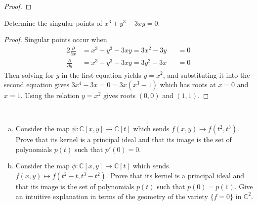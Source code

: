 \documentclass{article}
\newenvironment{problem}[2][Problem]{\begin{trivlist}
\item[\hskip \labelsep {\bfseries #1}\hskip \labelsep {\bfseries #2.}]}{\end{trivlist}}
\newcommand{\set}[1]{\{ #1 \}}
\newcommand{\fn}[3]{#1 \colon #2 \rightarrow #3}
\begin{document}
\begin{proof}

\end{proof}
\pagebreak
\begin{problem}{15 (Artin)}
  Determine the singular points of $x^3 + y^3  - 3xy = 0$.
\end{problem}

\begin{proof}
  Singular points occur when \begin{alignat*}{2}
    \frac{\partial}{\partial x} &= x^3 + y^3  - 3xy = 3x^2 - 3y &&= 0 \\
    \frac{\partial}{\partial y} &= x^3 + y^3  - 3xy = 3y^2 - 3x &&= 0
  \end{alignat*}
  Then solving for $y$ in the first equation yields $y = x^2$, and substituting it
  into the second equation gives $3x^4 - 3x = 0 = 3x(x^3 - 1)$ which has roots at
  $x = 0$ and $x = 1$. Using the relation $y = x^2$ gives roots $(0, 0)$ and
  $(1, 1)$.
\end{proof}
\pagebreak
\begin{problem}{16 (Artin)} ~
  \begin{enumerate}[(a)]
    \item Consider the map $\fn \psi {\mathbb C[x, y]}{\mathbb C[t]}$ which sends
    $f(x, y) \mapsto f(t^2, t^3)$. Prove that its kernel is a principal ideal
    and that its image is the set of polynomials $p(t)$ such that $p'(0) = 0$.
    \item Consider the map $\fn \phi {\mathbb C[x, y]}{\mathbb C[t]}$ which sends
    $f(x, y) \mapsto f(t^2 - t, t^3 - t^2)$. Prove that its kernel is a principal ideal
    and that its image is the set of polynomials $p(t)$ such that $p(0) = p(1)$.
    Give an intuitive explanation in terms of the geometry of the variety
    $\set{f=0}$ in $\mathbb C^2$.
  \end{enumerate}
\end{problem}
\end{document}
